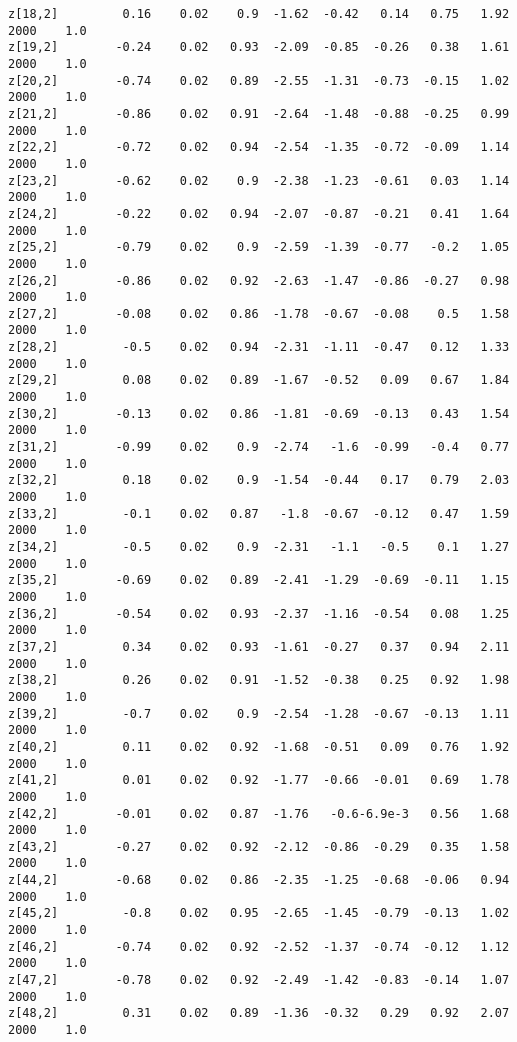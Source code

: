 \documentclass[11pt]{article}
\begin{document}
\begin{Verbatim}[commandchars=\\\{\}]
z[18,2]         0.16    0.02    0.9  -1.62  -0.42   0.14   0.75   1.92   2000    1.0
z[19,2]        -0.24    0.02   0.93  -2.09  -0.85  -0.26   0.38   1.61   2000    1.0
z[20,2]        -0.74    0.02   0.89  -2.55  -1.31  -0.73  -0.15   1.02   2000    1.0
z[21,2]        -0.86    0.02   0.91  -2.64  -1.48  -0.88  -0.25   0.99   2000    1.0
z[22,2]        -0.72    0.02   0.94  -2.54  -1.35  -0.72  -0.09   1.14   2000    1.0
z[23,2]        -0.62    0.02    0.9  -2.38  -1.23  -0.61   0.03   1.14   2000    1.0
z[24,2]        -0.22    0.02   0.94  -2.07  -0.87  -0.21   0.41   1.64   2000    1.0
z[25,2]        -0.79    0.02    0.9  -2.59  -1.39  -0.77   -0.2   1.05   2000    1.0
z[26,2]        -0.86    0.02   0.92  -2.63  -1.47  -0.86  -0.27   0.98   2000    1.0
z[27,2]        -0.08    0.02   0.86  -1.78  -0.67  -0.08    0.5   1.58   2000    1.0
z[28,2]         -0.5    0.02   0.94  -2.31  -1.11  -0.47   0.12   1.33   2000    1.0
z[29,2]         0.08    0.02   0.89  -1.67  -0.52   0.09   0.67   1.84   2000    1.0
z[30,2]        -0.13    0.02   0.86  -1.81  -0.69  -0.13   0.43   1.54   2000    1.0
z[31,2]        -0.99    0.02    0.9  -2.74   -1.6  -0.99   -0.4   0.77   2000    1.0
z[32,2]         0.18    0.02    0.9  -1.54  -0.44   0.17   0.79   2.03   2000    1.0
z[33,2]         -0.1    0.02   0.87   -1.8  -0.67  -0.12   0.47   1.59   2000    1.0
z[34,2]         -0.5    0.02    0.9  -2.31   -1.1   -0.5    0.1   1.27   2000    1.0
z[35,2]        -0.69    0.02   0.89  -2.41  -1.29  -0.69  -0.11   1.15   2000    1.0
z[36,2]        -0.54    0.02   0.93  -2.37  -1.16  -0.54   0.08   1.25   2000    1.0
z[37,2]         0.34    0.02   0.93  -1.61  -0.27   0.37   0.94   2.11   2000    1.0
z[38,2]         0.26    0.02   0.91  -1.52  -0.38   0.25   0.92   1.98   2000    1.0
z[39,2]         -0.7    0.02    0.9  -2.54  -1.28  -0.67  -0.13   1.11   2000    1.0
z[40,2]         0.11    0.02   0.92  -1.68  -0.51   0.09   0.76   1.92   2000    1.0
z[41,2]         0.01    0.02   0.92  -1.77  -0.66  -0.01   0.69   1.78   2000    1.0
z[42,2]        -0.01    0.02   0.87  -1.76   -0.6-6.9e-3   0.56   1.68   2000    1.0
z[43,2]        -0.27    0.02   0.92  -2.12  -0.86  -0.29   0.35   1.58   2000    1.0
z[44,2]        -0.68    0.02   0.86  -2.35  -1.25  -0.68  -0.06   0.94   2000    1.0
z[45,2]         -0.8    0.02   0.95  -2.65  -1.45  -0.79  -0.13   1.02   2000    1.0
z[46,2]        -0.74    0.02   0.92  -2.52  -1.37  -0.74  -0.12   1.12   2000    1.0
z[47,2]        -0.78    0.02   0.92  -2.49  -1.42  -0.83  -0.14   1.07   2000    1.0
z[48,2]         0.31    0.02   0.89  -1.36  -0.32   0.29   0.92   2.07   2000    1.0

\end{Verbatim}
\end{document}
